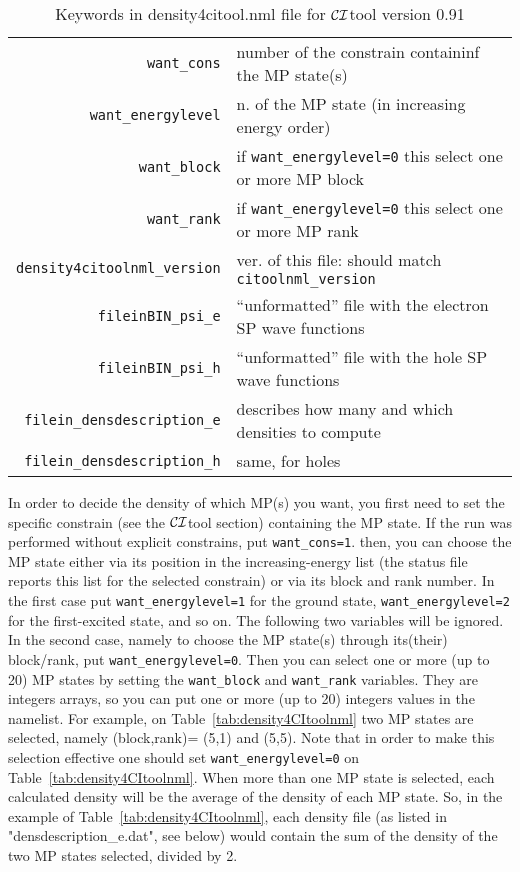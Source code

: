 \documentclass[12pt,twoside]{article}
\newcommand*{\CItool}[0]{{$\cal CI$}\textsf{tool} }
\begin{document}
\begin{table}
\begin{tabular}{r|l}
\verb#want_cons# & number of the constrain containinf the MP state(s) \\
\verb#want_energylevel# & n. of the MP state (in increasing energy order) \\
\verb#want_block# & if \verb#want_energylevel=0# this select one or more MP block \\
\verb#want_rank#  & if \verb#want_energylevel=0# this select one or more MP rank \\
\verb#density4citoolnml_version# & ver. of this file: should match \verb#citoolnml_version# \\
\verb#fileinBIN_psi_e# & ``unformatted'' file with the electron SP wave functions \\
\verb#fileinBIN_psi_h# & ``unformatted'' file with the hole SP wave functions \\
\verb#filein_densdescription_e# & describes how many and which densities to compute \\
\verb#filein_densdescription_h# & same, for holes
\end{tabular}
\caption{Keywords in \textsf{density4citool.nml} file for \CItool version 0.91}
\label{tab:density4CItoolnmlkey}
\end{table}

In order to decide the density of which MP(s) you want, you first need to
set the specific constrain (see the \CItool section) containing the MP state.
If the run was performed without explicit constrains, put \verb#want_cons=1#.
then, you can choose the MP state either via its position in the increasing-energy
list (the status file reports this list for the selected constrain) or via
its block and rank number. In the first case put \verb#want_energylevel=1#
for the ground state, \verb#want_energylevel=2# for the first-excited state, and so on.
The following two variables will be ignored.
In the second case, namely to choose the MP state(s) through its(their) block/rank, put 
\verb#want_energylevel=0#. Then you can select one or more (up to 20) MP states by
setting the \verb#want_block# and \verb#want_rank# variables. They are integers
arrays, so you can put one or more (up to 20) integers values in the namelist.
For example, on Table~\ref{tab:density4CItoolnml} two MP states are
selected, namely (block,rank)= (5,1) and (5,5).
Note that in order to make this selection effective one should set \verb#want_energylevel=0#
on Table~\ref{tab:density4CItoolnml}.
When more than one MP state is selected, each calculated density will be the average
of the density of each MP state.  So, in the example of Table~\ref{tab:density4CItoolnml},
each density file (as listed in "densdescription\_e.dat", see below) would contain
the sum of the density of the two MP states selected, divided by 2.
\end{document}
